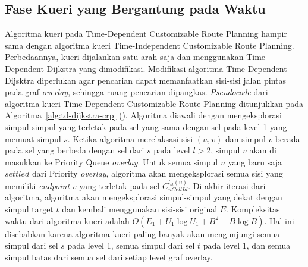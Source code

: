 \subsection{Fase Kueri yang Bergantung pada Waktu}
\label{subsec:tdcrp-time-dependent-query}
Algoritma kueri pada Time-Dependent Customizable Route Planning hampir sama dengan algoritma kueri Time-Independent Customizable Route Planning. Perbedaannya, kueri dijalankan satu arah saja dan menggunakan Time-Dependent Dijkstra yang dimodifikasi. Modifikasi algoritma Time-Dependent Dijsktra diperlukan agar pencarian dapat memanfaatkan sisi-sisi jalan pintas pada graf \textit{overlay}, sehingga ruang pencarian dipangkas. \textit{Pseudocode} dari algoritma kueri Time-Dependent Customizable Route Planning ditunjukkan pada Algoritma~\ref{alg:td-dijkstra-crp} (\cite{Baum2016}). Algoritma diawali dengan mengeksplorasi simpul-simpul yang terletak pada sel yang sama dengan sel pada level-1 yang memuat simpul $s$. Ketika algoritma merelaksasi sisi $(u,v)$ dan simpul $v$ berada pada sel yang berbeda dengan sel dari $s$ pada level $l>2$, simpul $v$ akan di masukkan ke Priority Queue \textit{overlay}. Untuk semua simpul $u$ yang baru saja $settled$ dari Priority \textit{overlay}, algoritma akan mengeksplorasi semua sisi yang memiliki \textit{endpoint} $v$ yang terletak pada sel $C^{l_{st}(u)}_{uCellId}$. Di akhir iterasi dari algoritma, algoritma akan mengeksplorasi simpul-simpul yang dekat dengan simpul target $t$ dan kembali menggunakan sisi-sisi original $E$. Kompleksitas waktu dari algoritma kueri adalah $O(E_1+U_1\log U_1+B^{2}+B \log B)$. Hal ini disebabkan karena algoritma kueri paling banyak akan mengunjungi semua simpul dari sel $s$ pada level 1, semua simpul dari sel $t$ pada level 1, dan semua simpul batas dari semua sel dari setiap level graf overlay. 



